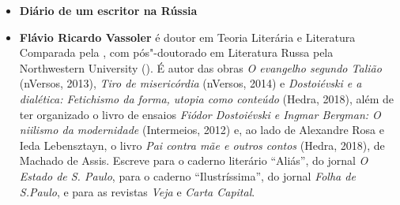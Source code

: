 \begin{itemize}


\item \textbf{Diário de um escritor na Rússia} \lipsum[1]
  
\item \textbf{Flávio Ricardo Vassoler} é doutor em Teoria Literária e Literatura Comparada pela , com pós"-doutorado em Literatura Russa pela Northwestern University (). É autor das obras \emph{O evangelho segundo Talião} (nVersos, 2013), \emph{Tiro de misericórdia} (nVersos, 2014) e \emph{Dostoiévski e a dialética: Fetichismo da forma, utopia como conteúdo} (Hedra, 2018), além de ter organizado o livro de ensaios \emph{Fiódor Dostoiévski e Ingmar Bergman: O niilismo da modernidade} (Intermeios, 2012) e, ao lado de Alexandre Rosa e Ieda Lebensztayn, o livro \emph{Pai contra mãe e outros contos} (Hedra, 2018), de Machado de Assis. Escreve para o caderno literário ``Aliás'', do jornal \emph{O Estado de S. Paulo}, para o caderno ``Ilustríssima'', do jornal \emph{Folha de S.Paulo}, e para as revistas \emph{Veja} e \emph{Carta Capital}. 

\end{itemize}

